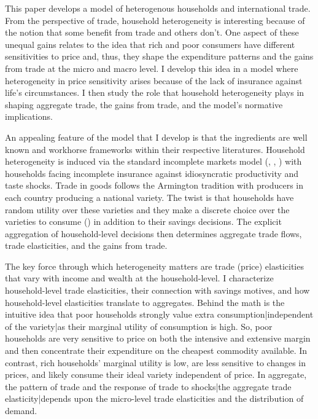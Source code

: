 \documentclass[12pt,pdftex]{article}
\begin{document}
\begin{onehalfspacing}
\hspace{-0.05cm}



\thispagestyle{empty}
\newpage
\normalsize

This paper develops a model of heterogenous households and international trade. From the perspective of trade, household heterogeneity is interesting because of the notion that some benefit from trade and others don't. One aspect of these unequal gains relates to the idea that rich and poor consumers have different sensitivities to price and, thus, they shape the expenditure patterns and the gains from trade at the micro and macro level. I develop this idea in a model where heterogeneity in price sensitivity arises because of the lack of insurance against life's circumstances. I then study the role that household heterogeneity plays in shaping aggregate trade, the gains from trade, and the model's normative implications.


An appealing feature of the model that I develop is that the ingredients are well known and workhorse frameworks within their respective literatures. Household heterogeneity is induced via the standard incomplete markets model (\citet{bewley1979optimum}, \citet{huggett1993risk}, \citet{aiyagari1994uninsured}) with households facing incomplete insurance against idiosyncratic productivity and taste shocks. Trade in goods follows the Armington tradition with producers in each country producing a national variety. The twist is that households have random utility over these varieties and they make a discrete choice over the varieties to consume (\citet{mcfadden1974frontiers}) in addition to their savings decisions. The explicit aggregation of household-level decisions then determines aggregate trade flows, trade elasticities, and the gains from trade.

The key force through which heterogeneity matters are trade (price) elasticities that vary with income and wealth at the household-level. I characterize household-level trade elasticities, their connection with savings motives, and how household-level elasticities translate to aggregates. Behind the math is the intuitive idea that poor households strongly value extra consumption|independent of the variety|as their marginal utility of consumption is high. So, poor households are very sensitive to price on both the intensive and extensive margin and then concentrate their expenditure on the cheapest commodity available. In contrast, rich households' marginal utility is low, are less sensitive to changes in prices, and likely consume their ideal variety independent of price. In aggregate, the pattern of trade and the response of trade to shocks|the aggregate trade elasticity|depends upon the micro-level trade elasticities and the distribution of demand.


\end{onehalfspacing}
\end{document}
